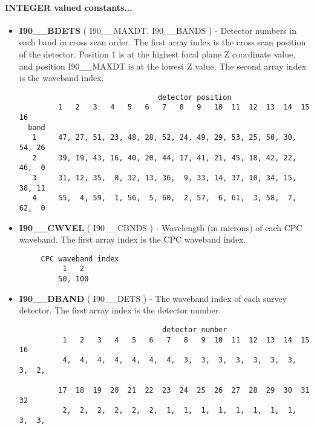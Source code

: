\paragraph{INTEGER valued constants...}
\begin{itemize}
\item {\bf I90\_\_BDETS} ( I90\_\_MAXDT, I90\_\_BANDS ) - Detector numbers in each band in
cross scan order. The first array index is the cross scan position of the detector.
Position 1 is at the highest focal plane Z coordinate value, and position
I90\_\_MAXDT is at the lowest Z value. The second array index is the waveband 
index. 

\begin{minipage}[t]{\textwidth}
\small
\begin{verbatim}
                                detector position
         1   2   3   4   5   6   7   8   9   10  11  12  13  14  15  16
  band
   1     47, 27, 51, 23, 48, 28, 52, 24, 49, 29, 53, 25, 50, 30, 54, 26
   2     39, 19, 43, 16, 40, 20, 44, 17, 41, 21, 45, 18, 42, 22, 46,  0
   3     31, 12, 35,  8, 32, 13, 36,  9, 33, 14, 37, 10, 34, 15, 38, 11
   4     55,  4, 59,  1, 56,  5, 60,  2, 57,  6, 61,  3, 58,  7, 62,  0
\end{verbatim}
\normalsize
\end{minipage}

\item {\bf I90\_\_CWVEL} ( I90\_\_CBNDS ) - Wavelength (in microns) of each CPC waveband.
The first array index is the CPC waveband index.

\begin{minipage}[t]{\textwidth}
\small
\begin{verbatim}
     CPC waveband index                           
          1   2   
         50, 100
\end{verbatim}
\normalsize
\end{minipage}

\item {\bf I90\_\_DBAND} ( I90\_\_DETS ) - The waveband index of each survey detector.
The first array index is the detector number.

\begin{minipage}[t]{\textwidth}
\small
\begin{verbatim}
                                 detector number
          1   2   3   4   5   6   7   8   9  10  11  12  13  14  15  16
          4,  4,  4,  4,  4,  4,  4,  3,  3,  3,  3,  3,  3,  3,  3,  2,

         17  18  19  20  21  22  23  24  25  26  27  28  29  30  31  32
          2,  2,  2,  2,  2,  2,  1,  1,  1,  1,  1,  1,  1,  1,  3,  3,


\end{verbatim}
\end{minipage}
\end{itemize}
